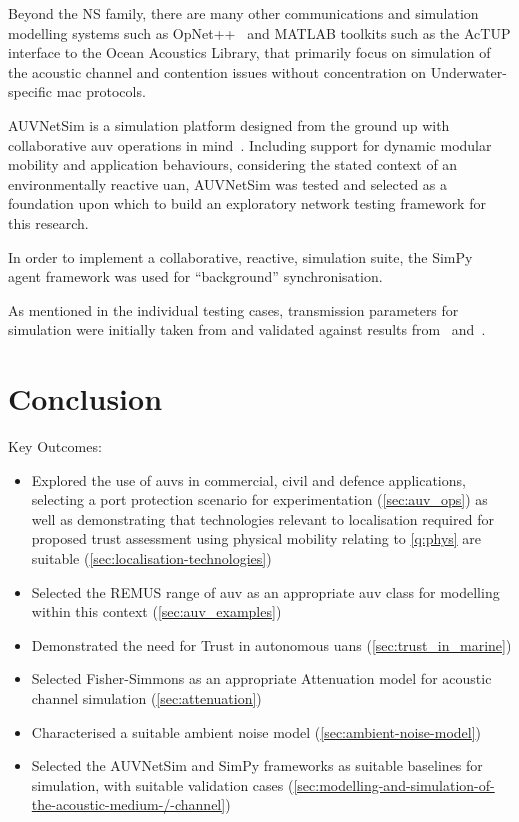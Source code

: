 Beyond the NS family, there are many other communications and simulation modelling systems such as OpNet++~\cite{Chang1999} and MATLAB toolkits such as the AcTUP interface to the Ocean Acoustics Library, that primarily focus on simulation of the acoustic channel and contention issues without concentration on Underwater-specific \gls{mac} protocols.

AUVNetSim is a simulation platform designed from the ground up with collaborative \gls{auv} operations in mind~\cite{Miquel2008}.
Including support for dynamic modular mobility and application behaviours, considering the stated context of an environmentally reactive \gls{uan}, AUVNetSim was tested and selected as a foundation upon which to build an exploratory network testing framework for this research.

In order to implement a collaborative, reactive, simulation suite, the SimPy~\cite{Mueller2003SimPy} agent framework was used for ``background'' synchronisation.

As mentioned in the individual testing cases, transmission parameters for simulation were initially taken from and validated against results from~\citet{Stojanovic2007} and~\citet{Stefanov2011}.


\section{Conclusion}


Key Outcomes:
\begin{itemize}
	\item Explored the use of \glspl{auv} in commercial, civil and defence applications, selecting a port protection scenario for experimentation (\autoref{sec:auv_ops}) as well as demonstrating that technologies relevant to localisation required for proposed trust assessment using physical mobility relating to \autoref{q:phys} are suitable (\autoref{sec:localisation-technologies})
	\item Selected the REMUS range of \gls{auv} as an appropriate \gls{auv} class for modelling within this context (\autoref{sec:auv_examples})
	\item Demonstrated the need for Trust in autonomous \glspl{uan} (\autoref{sec:trust_in_marine})
	\item Selected Fisher-Simmons as an appropriate Attenuation model for acoustic channel simulation (\autoref{sec:attenuation})
	\item Characterised a suitable ambient noise model (\autoref{sec:ambient-noise-model})
	\item Selected the AUVNetSim and SimPy frameworks as suitable baselines for simulation, with suitable validation cases (\autoref{sec:modelling-and-simulation-of-the-acoustic-medium-/-channel})
\end{itemize}

